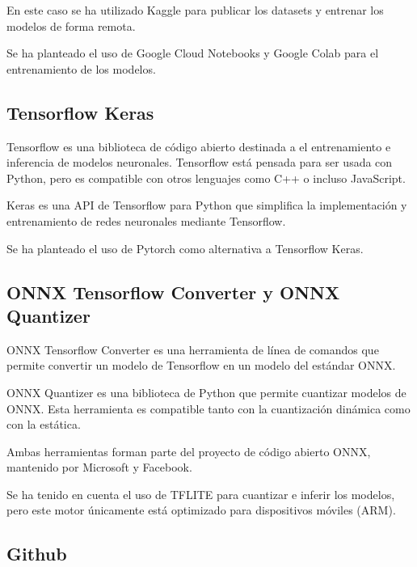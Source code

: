 En este caso se ha utilizado Kaggle para publicar los datasets y
entrenar los modelos de forma remota.

Se ha planteado el uso de Google Cloud Notebooks y Google Colab para el
entrenamiento de los modelos.

\hypertarget{tensorflow-keras}{%
\subsection{Tensorflow Keras}\label{tensorflow-keras}}

Tensorflow \cite{tensorflow2015-whitepaper} es una biblioteca de código abierto destinada a el
entrenamiento e inferencia de modelos neuronales. Tensorflow está
pensada para ser usada con Python, pero es compatible con otros
lenguajes como C++ o incluso JavaScript.

Keras es una API de Tensorflow para Python que simplifica la
implementación y entrenamiento de redes neuronales mediante Tensorflow.

Se ha planteado el uso de Pytorch como alternativa a Tensorflow Keras.

\hypertarget{section-3}{%
\subsection{}\label{section-3}}

\hypertarget{onnx-tensorflow-converter-y-onnx-quantizer}{%
\subsection{ONNX Tensorflow Converter y ONNX
Quantizer}\label{onnx-tensorflow-converter-y-onnx-quantizer}}

ONNX Tensorflow Converter \cite{onnxruntime} es una herramienta de línea de comandos que
permite convertir un modelo de Tensorflow en un modelo del estándar
ONNX.

ONNX Quantizer es una biblioteca de Python que permite cuantizar modelos
de ONNX. Esta herramienta es compatible tanto con la cuantización
dinámica como con la estática.

Ambas herramientas forman parte del proyecto de código abierto ONNX,
mantenido por Microsoft y Facebook.

Se ha tenido en cuenta el uso de TFLITE para cuantizar e inferir los modelos,
pero este motor únicamente está optimizado para dispositivos móviles
(ARM).

\hypertarget{github}{%
\subsection{Github}\label{github}}

